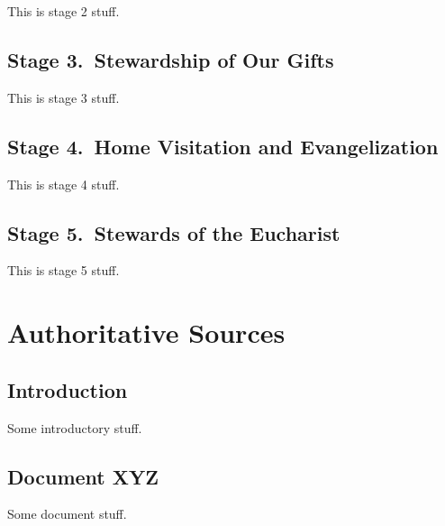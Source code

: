 \documentclass[oneside]{book}
\begin{document}
This is stage 2 stuff.


\chapter{Stage 3.\ Stewardship of Our Gifts}

This is stage 3 stuff.


\chapter{Stage 4.\ Home Visitation and Evangelization}

This is stage 4 stuff.


\chapter{Stage 5.\ Stewards of the Eucharist}

This is stage 5 stuff.


\part{Authoritative Sources}


\chapter{Introduction}

Some introductory stuff.


\chapter{Document XYZ}

Some document stuff.

\end{document}

